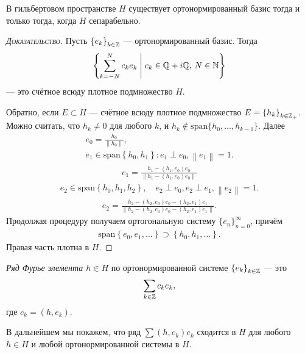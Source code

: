 \documentclass[../complex-analysis.tex]{subfiles}
\begin{document}
\begin{claim}
 В гильбертовом пространстве $ H $ существует ортонормированный базис тогда и только тогда, когда $ H $ сепарабельно.
\end{claim}
\begin{proof}[\normalfont\textsc{Доказательство}]
 Пусть $ \left\{e_k\right\}_{k \in \mathbb{Z}}  $ --- ортонормированный базис. Тогда \begin{align*}
  \left\{ \sum_{k=-N}^{N} c_ke_k \;\middle|\; c_k \in \mathbb{Q} + i\mathbb{Q},\, N \in\mathbb{N} \right\}
 \end{align*} --- это счётное всюду плотное подмножество $ H $.

Обратно, если $ E \subset H $ --- счётное всюду плотное подмножество $ E = \left\{ h_k \right\}_{k \in \mathbb{Z}_+} $. Можно считать, что $ h_k \neq 0 $ для любого $ k $, и $ h_k \notin \mathrm{span}\{h_0, \ldots, h_{k-1}\} $. Далее
 \begin{align*}
  e_0 = \frac{h_0}{\left\| h_0 \right\|}, \\
  e_1 \in \mathrm{span} \left\{ h_0,h_1 \right\} \colon e_1 \perp e_0, \left\| e_1 \right\| = 1.
 \end{align*} \begin{align*}
  e_1 = \frac{h_1 - (h_1, e_0)e_0}{\left\| h_1 - (h_1, e_0)e_0 \right\|}
 \end{align*}
 \begin{align*}
  e_2 \in \mathrm{span} \left\{ h_0, h_1, h_2 \right\}, \quad e_2 \perp e_0, e_2 \perp e_1, \left\| e_2 \right\| = 1.
 \end{align*}
 \begin{align*}
  e_2 = \frac{h_2 - (h_2, e_0)e_0 - (h_2, e_1)e_1}{\left\| h_2 - (h_2, e_0)e_0 - (h_2, e_1)e_1  \right\|}.
 \end{align*} Продолжая процедуру получаем ортогональную систему $ \{e_{n}\}_{n=0}^{\infty}   $, причём
 \begin{align*}
  \mathrm{span} \left\{ e_0, e_1, \ldots \right\} \supset \left\{ h_0, h_1, \ldots \right\}.
 \end{align*} Правая часть плотна в $ H $.
\end{proof}

\begin{df}
 \textit{Ряд Фурье элемента $ h \in H $} по ортонормированной системе $ \left\{e_k\right\}_{k \in \mathbb{Z}}  $ --- это
 \begin{align*}
  \sum_{k\in\mathbb{Z}} c_ke_k, 
 \end{align*} где $c_k = (h,e_k)$.
\end{df}
\begin{remrk*}
 В дальнейшем мы покажем, что ряд $ \sum (h, e_k)e_k $ сходится в $ H $ для любого $ h \in H $ и любой ортонормированной системы в $ H $.
\end{remrk*}
\end{document}
